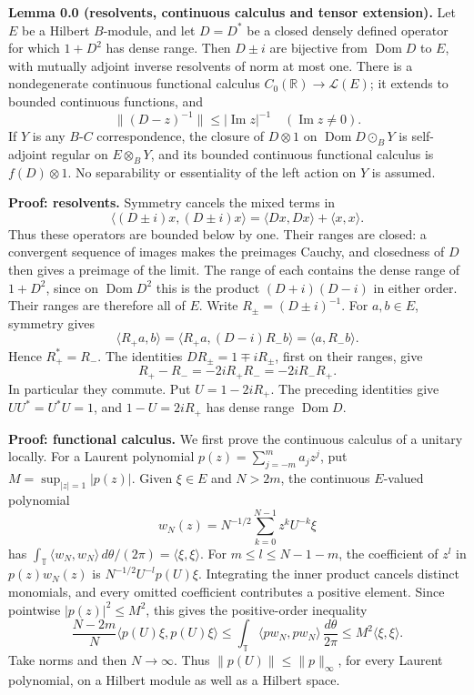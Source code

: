 \documentclass[
  11pt,
]{article}
\begin{document}
\textbf{Lemma 0.0 (resolvents, continuous calculus and tensor
extension).} Let \(E\) be a Hilbert \(B\)-module, and let \(D=D^*\) be a
closed densely defined operator for which \(1+D^2\) has dense range.
Then \(D\pm i\) are bijective from \(\operatorname{Dom}D\) to \(E\),
with mutually adjoint inverse resolvents of norm at most one. There is a
nondegenerate continuous functional calculus
\(C_0(\mathbb R)\to\mathcal L(E)\); it extends to bounded continuous
functions, and \[
\|(D-z)^{-1}\|\leq |\operatorname{Im}z|^{-1}
\quad(\operatorname{Im}z\ne0).
\] If \(Y\) is any \(B\)-\(C\) correspondence, the closure of
\(D\otimes1\) on \(\operatorname{Dom}D\odot_B Y\) is self-adjoint
regular on \(E\otimes_B Y\), and its bounded continuous functional
calculus is \(f(D)\otimes1\). No separability or essentiality of the
left action on \(Y\) is assumed.

\textbf{Proof: resolvents.} Symmetry cancels the mixed terms in \[
\langle(D\pm i)x,(D\pm i)x\rangle
=\langle Dx,Dx\rangle+\langle x,x\rangle.
\] Thus these operators are bounded below by one. Their ranges are
closed: a convergent sequence of images makes the preimages Cauchy, and
closedness of \(D\) then gives a preimage of the limit. The range of
each contains the dense range of \(1+D^2\), since on
\(\operatorname{Dom}D^2\) this is the product \((D+i)(D-i)\) in either
order. Their ranges are therefore all of \(E\). Write
\(R_\pm=(D\pm i)^{-1}\). For \(a,b\in E\), symmetry gives \[
\langle R_+a,b\rangle
=\langle R_+a,(D-i)R_-b\rangle
=\langle a,R_-b\rangle.
\] Hence \(R_+^*=R_-\). The identities \(DR_\pm=1\mp iR_\pm\), first on
their ranges, give \[
R_+-R_-=-2iR_+R_-=-2iR_-R_+.
\] In particular they commute. Put \(U=1-2iR_+\). The preceding
identities give \(UU^*=U^*U=1\), and \(1-U=2iR_+\) has dense range
\(\operatorname{Dom}D\).

\textbf{Proof: functional calculus.} We first prove the continuous
calculus of a unitary locally. For a Laurent polynomial
\(p(z)=\sum_{j=-m}^m a_jz^j\), put \(M=\sup_{|z|=1}|p(z)|\). Given
\(\xi\in E\) and \(N>2m\), the continuous \(E\)-valued polynomial \[
w_N(z)=N^{-1/2}\sum_{k=0}^{N-1}z^kU^{-k}\xi
\] has
\(\int_{\mathbb T}\langle w_N,w_N\rangle\,d\theta/(2\pi)=\langle\xi,\xi\rangle\).
For \(m\leq l\leq N-1-m\), the coefficient of \(z^l\) in \(p(z)w_N(z)\)
is \(N^{-1/2}U^{-l}p(U)\xi\). Integrating the inner product cancels
distinct monomials, and every omitted coefficient contributes a positive
element. Since pointwise \(|p(z)|^2\leq M^2\), this gives the
positive-order inequality \[
\frac{N-2m}{N}\langle p(U)\xi,p(U)\xi\rangle
\leq \int_{\mathbb T}\langle p w_N,p w_N\rangle\,\frac{d\theta}{2\pi}
\leq M^2\langle\xi,\xi\rangle.
\] Take norms and then \(N\to\infty\). Thus
\(\|p(U)\|\leq\|p\|_\infty\), for every Laurent polynomial, on a Hilbert
module as well as a Hilbert space.
\end{document}
